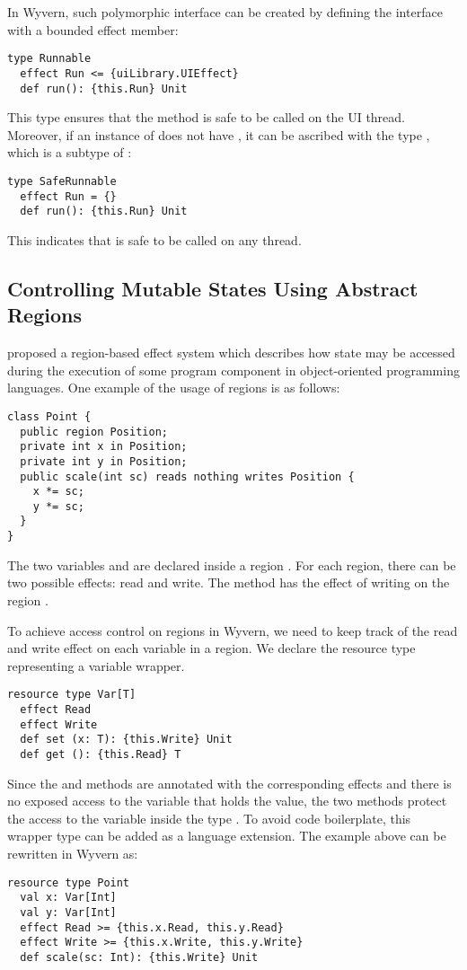 In Wyvern, such polymorphic interface can be created by defining the interface with a bounded effect member:
\begin{lstlisting}[numbers=none]
type Runnable
  effect Run <= {uiLibrary.UIEffect}
  def run(): {this.Run} Unit
\end{lstlisting}
This type ensures that the  method is safe to be called on the UI thread. Moreover, if an instance of  does not have , it can be ascribed with the type , which is a subtype of :
\begin{lstlisting}[numbers=none]
type SafeRunnable
  effect Run = {}
  def run(): {this.Run} Unit
\end{lstlisting}
This indicates that  is safe to be called on any thread.


\subsection{Controlling Mutable States Using Abstract Regions}

\cite{grennhouse99} proposed a region-based effect system which describes how state may be accessed during the execution of some program component in object-oriented programming languages. One example of the usage of regions is as follows:
\begin{lstlisting}[numbers=none]
class Point {
  public region Position;
  private int x in Position; 
  private int y in Position; 
  public scale(int sc) reads nothing writes Position {
    x *= sc; 
    y *= sc; 
  }
}
\end{lstlisting}
The two variables  and  are declared inside a region . For each region, there can be two possible effects: read and write. The  method has the effect of writing on the region .

To achieve access control on regions in Wyvern, we need to keep track of the read and write effect on each variable in a region. We declare the resource type  representing a variable wrapper.
\begin{lstlisting}[numbers=none]
resource type Var[T]
  effect Read
  effect Write
  def set (x: T): {this.Write} Unit
  def get (): {this.Read} T
\end{lstlisting}

Since the  and  methods are annotated with the corresponding effects and there is no exposed access to the variable that holds the value, the two methods protect the access to the variable inside the type . To avoid code boilerplate, this wrapper type can be added as a language extension. The  example above can be rewritten in Wyvern as:
\begin{lstlisting}[numbers=none]
resource type Point
  val x: Var[Int]
  val y: Var[Int]
  effect Read >= {this.x.Read, this.y.Read}
  effect Write >= {this.x.Write, this.y.Write}
  def scale(sc: Int): {this.Write} Unit
\end{lstlisting}

